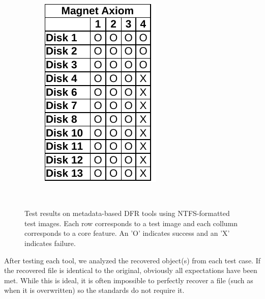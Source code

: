 \begin{paraphrase}
\begin{figure}
\begin{subfigure}{0.17\linewidth}
        \includegraphics[width=\linewidth]{fig/axiom_results_ntfs.pdf}
    \end{subfigure}~~
        
    \caption{Test results on metadata-based DFR tools using NTFS-formatted test images. Each row corresponds to a test image and each collumn corresponds to a core feature. An 'O' indicates success and an 'X' indicates failure.}
    \label{fig:results_ntfs}
\end{figure}

 After testing each tool, we analyzed the recovered object(s) from each test case. 
If the recovered file is identical to the original, obviously all expectations have been met. 
While this is ideal, it is often impossible to perfectly recover a file (such as when it is overwritten) so the standards do not require it. 


\end{paraphrase}
